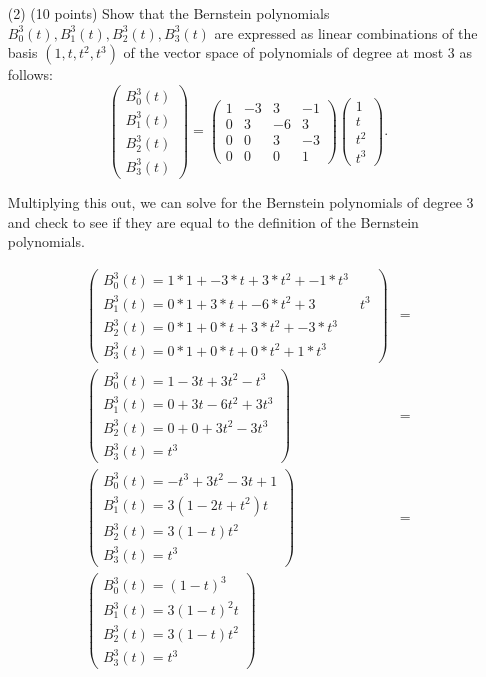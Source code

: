 \documentclass[12pt]{article}
\begin{document}
\begin{itemize}
\item[(2)](10 points)
Show that the Bernstein polynomials $B_0^3(t), B_1^3(t), B_2^3(t), B_3^3(t)$
are expressed as linear combinations of the basis
$(1, t, t^2, t^3)$ of the vector space of polynomials of degree at most $3$ 
as follows:
\[
\begin{pmatrix}
B_0^3(t)\\
B_1^3(t)\\
B_2^3(t) \\
B_3^3(t) 
\end{pmatrix} = 
\begin{pmatrix}
1 & -3  & 3 & -1 \\
0 &  3  & -6 & 3 \\
0 &  0  & 3  & -3 \\
0 &  0  & 0  & 1
\end{pmatrix} 
\begin{pmatrix}
1 \\
t \\
t^2\\
t^3
\end{pmatrix}. 
\]

Multiplying this out, we can solve for the Bernstein polynomials of degree 3 and check to see if they are equal to the definition of the Bernstein polynomials.

\begin{align*}
    \begin{pmatrix}
    B_0^3(t) = 1 * 1 + -3 * t + 3 * t^2 + -1 * t^3 \\
    B_1^3(t) = 0 * 1 + 3 * t + -6 * t^2 + 3 & t^3 \\
    B_2^3(t) = 0 * 1 + 0 * t + 3 * t^2 + -3 * t^3 \\
    B_3^3(t) = 0 * 1 + 0 * t + 0 * t^2 + 1 * t^3
    \end{pmatrix} &= \\
    \begin{pmatrix}
        B_0^3(t) = 1 - 3t + 3t^2 - t^3 \\
        B_1^3(t) = 0 + 3t - 6t^2 + 3t^3 \\
        B_2^3(t) = 0 + 0 + 3t^2 - 3t^3 \\
        B_3^3(t) = t^3
    \end{pmatrix} &= \\
    \begin{pmatrix}
        B_0^3(t) = -t^3 + 3t^2 - 3t + 1 \\
        B_1^3(t) = 3(1 - 2t + t^2)t \\
        B_2^3(t) = 3(1 - t)t^2 \\
        B_3^3(t) = t^3 
    \end{pmatrix} &= \\
    \begin{pmatrix}
        B_0^3(t) = (1 - t)^3 \\
        B_1^3(t) = 3(1 - t)^2t \\
        B_2^3(t) = 3(1 - t)t^2 \\
        B_3^3(t) = t^3
    \end{pmatrix}
\end{align*}


\end{itemize}
\end{document}
